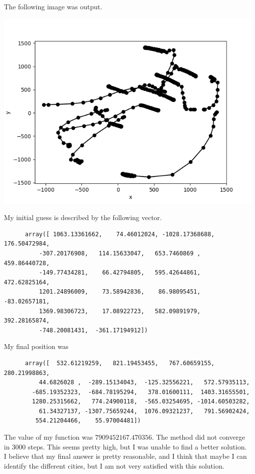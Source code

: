 \documentclass[11pt, oneside]{article}
\begin{document}
\begin{enumerate}
    The following image was output.
    \begin{center}
      \includegraphics[scale=.8]{Figures/midtermExam_2}
    \end{center}

    My initial guess is described by the following vector.
    \begin{verbatim}
      array([ 1063.13361662,    74.46012024, -1028.17368688,   176.50472984,
          -307.20176908,   114.15633047,   653.7460869 ,   459.86440728,
          -149.77434281,    66.42794805,   595.42644861,   472.62825164,
          1201.24896009,    73.58942836,    86.98095451,   -83.02657181,
          1369.98306723,    17.08922723,   582.09891979,   392.28165874,
          -748.20081431,  -361.17194912]) 
    \end{verbatim}
    My final position was
    \begin{verbatim}
      array([  532.61219259,   821.19453455,   767.60659155,   280.21998863,
          44.6826028 ,  -289.15134043,  -125.32556221,   572.57935113,
        -685.19352323,  -684.78195294,   378.01600111,  1403.31655501,
        1280.25315662,   774.24900118,  -565.03254695, -1014.60503282,
          61.34327137, -1307.75659244,  1076.09321237,   791.56902424,
         554.21204466,    55.97004481])
    \end{verbatim}
    The value of my function was $7909452167.470356$.
    The method did not converge in 3000 steps.
    This seems pretty high, but I was unable to find a better solution.
    I believe that my final answer is pretty reasonable, and I think that
    maybe I can identify the different cities, but I am not very
    satisfied with this solution.
\end{enumerate}
\end{document}
